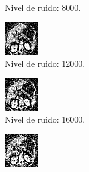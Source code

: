 \documentclass[a4paper]{article}
\begin{document}
\begin{figure}
\begin{subfigure}{0.4\linewidth}
  \caption{Nivel de ruido: 8000.}
\end{subfigure}
\begin{subfigure}{0.4\linewidth}
  \centering
  \includegraphics[width=0.6\linewidth]{ruido/tomo2-ruido12000}
  \caption{Nivel de ruido: 12000.}
\end{subfigure}
\begin{subfigure}{0.4\linewidth}
  \centering
  \includegraphics[width=0.6\linewidth]{ruido/tomo2-ruido16000}
  \caption{Nivel de ruido: 16000.}
\end{subfigure}
\begin{subfigure}{0.4\linewidth}
  \centering
  \includegraphics[width=0.6\linewidth]{ruido/tomo2-ruido20000}

\end{subfigure}
\end{figure}
\end{document}

